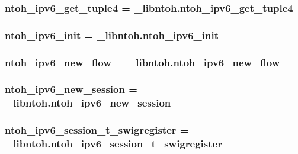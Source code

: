 \hypertarget{namespacelibntoh_ac126aa8798d2967cd7b07680e23375bc}{
\subsubsection[{ntoh\-\_\-ipv6\-\_\-get\-\_\-tuple4}]{\setlength{\rightskip}{0pt plus 5cm}ntoh\-\_\-ipv6\-\_\-get\-\_\-tuple4 = \-\_\-libntoh.\-ntoh\-\_\-ipv6\-\_\-get\-\_\-tuple4}}\label{namespacelibntoh_ac126aa8798d2967cd7b07680e23375bc}
\hypertarget{namespacelibntoh_ad8c16993a5b572e131b7c0936e1909d9}{
\subsubsection[{ntoh\-\_\-ipv6\-\_\-init}]{\setlength{\rightskip}{0pt plus 5cm}ntoh\-\_\-ipv6\-\_\-init = \-\_\-libntoh.\-ntoh\-\_\-ipv6\-\_\-init}}\label{namespacelibntoh_ad8c16993a5b572e131b7c0936e1909d9}
\hypertarget{namespacelibntoh_a9d97b5cc2c09d07f492699c41c7e62d8}{
\subsubsection[{ntoh\-\_\-ipv6\-\_\-new\-\_\-flow}]{\setlength{\rightskip}{0pt plus 5cm}ntoh\-\_\-ipv6\-\_\-new\-\_\-flow = \-\_\-libntoh.\-ntoh\-\_\-ipv6\-\_\-new\-\_\-flow}}\label{namespacelibntoh_a9d97b5cc2c09d07f492699c41c7e62d8}
\hypertarget{namespacelibntoh_ad00e325a03337be21874370198d0540e}{
\subsubsection[{ntoh\-\_\-ipv6\-\_\-new\-\_\-session}]{\setlength{\rightskip}{0pt plus 5cm}ntoh\-\_\-ipv6\-\_\-new\-\_\-session = \-\_\-libntoh.\-ntoh\-\_\-ipv6\-\_\-new\-\_\-session}}\label{namespacelibntoh_ad00e325a03337be21874370198d0540e}
\hypertarget{namespacelibntoh_a75195302d0e2d92ba46a7cb3841ce2ae}{
\subsubsection[{ntoh\-\_\-ipv6\-\_\-session\-\_\-t\-\_\-swigregister}]{\setlength{\rightskip}{0pt plus 5cm}ntoh\-\_\-ipv6\-\_\-session\-\_\-t\-\_\-swigregister = \-\_\-libntoh.\-ntoh\-\_\-ipv6\-\_\-session\-\_\-t\-\_\-swigregister}}\label{namespacelibntoh_a75195302d0e2d92ba46a7cb3841ce2ae}
